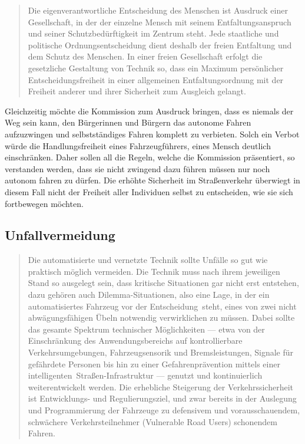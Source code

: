 \documentclass[twoside,a4paper,12pt]{article}
\begin{document}
\begin{quote}
\glqq
Die eigenverantwortliche Entscheidung des Menschen ist Ausdruck einer Gesellschaft, in
der der einzelne Mensch mit seinem Entfaltungsanspruch und seiner Schutzbedürftigkeit
im Zentrum steht. Jede staatliche und politische Ordnungsentscheidung dient deshalb
der freien Entfaltung und dem Schutz des Menschen. In einer freien Gesellschaft erfolgt
die gesetzliche Gestaltung von Technik so, dass ein Maximum persönlicher Entscheidungsfreiheit in einer allgemeinen 
Entfaltungsordnung mit der Freiheit anderer und ihrer
Sicherheit zum Ausgleich gelangt.\grqq\mbox{~\cite[S. 10]{ek}}
\end{quote}
Gleichzeitig möchte die Kommission zum Ausdruck bringen, dass es niemals der Weg sein kann, den Bürgerinnen und Bürgern das autonome Fahren aufzuzwingen und 
 selbstständiges Fahren komplett zu verbieten. Solch ein Verbot würde die Handlungsfreiheit eines Fahrzeugführers, eines Mensch deutlich einschränken.
 Daher sollen all die Regeln, welche die Kommission präsentiert, so verstanden werden, dass sie nicht zwingend dazu führen müssen nur noch autonom fahren zu dürfen.
 Die erhöhte Sicherheit im Straßenverkehr überwiegt in diesem Fall nicht der Freiheit aller Individuen selbst zu entscheiden, wie sie sich fortbewegen möchten.

\subsection{Unfallvermeidung} \label{Unfallvermeidung}

\begin{quote}
\glqq
Die automatisierte und vernetzte Technik sollte Unfälle so gut wie praktisch möglich vermeiden. Die Technik muss nach 
ihrem jeweiligen Stand so ausgelegt sein, dass kritische
Situationen gar nicht erst entstehen, dazu gehören auch Dilemma-Situationen, also eine
Lage, in der ein automatisiertes Fahrzeug vor der \glqq Entscheidung\grqq\ steht, eines von zwei
nicht abwägungsfähigen Übeln notwendig verwirklichen zu müssen. Dabei sollte das gesamte Spektrum technischer 
Möglichkeiten --- etwa von der Einschränkung des Anwendungsbereichs auf kontrollierbare Verkehrsumgebungen, 
Fahrzeugsensorik und Bremsleistungen, Signale für gefährdete Personen bis hin zu einer Gefahrenprävention mittels
einer \glqq intelligenten\grqq\ Straßen-Infrastruktur --- genutzt und kontinuierlich weiterentwickelt
werden. Die erhebliche Steigerung der Verkehrssicherheit ist Entwicklungs- und Regulierungsziel, und zwar bereits in der 
Auslegung und Programmierung der Fahrzeuge zu defensivem und vorausschauendem, schwächere Verkehrsteilnehmer (\glqq Vulnerable Road
Users\grqq) schonendem Fahren.\grqq\mbox{~\cite[S. 10]{ek}}
\end{quote}
\end{document}
